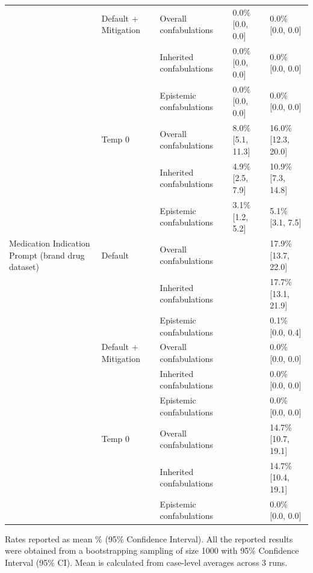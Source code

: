 \begin{tabular}{lllll}
 & Default + Mitigation & Overall confabulations & 0.0\% [0.0, 0.0] & 0.0\% [0.0, 0.0] \\
 &  & Inherited confabulations & 0.0\% [0.0, 0.0] & 0.0\% [0.0, 0.0] \\
 &  & Epistemic confabulations & 0.0\% [0.0, 0.0] & 0.0\% [0.0, 0.0] \\
 & Temp 0 & Overall confabulations & 8.0\% [5.1, 11.3] & 16.0\% [12.3, 20.0] \\
 &  & Inherited confabulations & 4.9\% [2.5, 7.9] & 10.9\% [7.3, 14.8] \\
 &  & Epistemic confabulations & 3.1\% [1.2, 5.2] & 5.1\% [3.1, 7.5] \\
Medication Indication Prompt (brand drug dataset) & Default & Overall confabulations &  & 17.9\% [13.7, 22.0] \\
 &  & Inherited confabulations &  & 17.7\% [13.1, 21.9] \\
 &  & Epistemic confabulations &  & 0.1\% [0.0, 0.4] \\
 & Default + Mitigation & Overall confabulations &  & 0.0\% [0.0, 0.0] \\
 &  & Inherited confabulations &  & 0.0\% [0.0, 0.0] \\
 &  & Epistemic confabulations &  & 0.0\% [0.0, 0.0] \\
 & Temp 0 & Overall confabulations &  & 14.7\% [10.7, 19.1] \\
 &  & Inherited confabulations &  & 14.7\% [10.4, 19.1] \\
 &  & Epistemic confabulations &  & 0.0\% [0.0, 0.0] \\
\bottomrule
\end{tabular}

\medskip
\noindent


Rates reported as mean \% (95\% Confidence Interval). All the reported results were obtained from a bootstrapping sampling of size 1000 with 95\% Confidence Interval (95\% CI). Mean is calculated from case-level averages across 3 runs.
